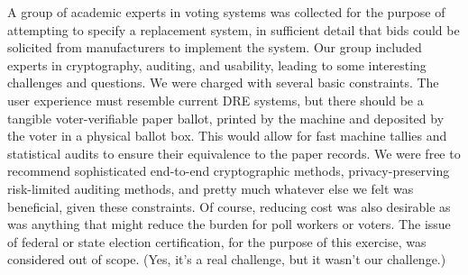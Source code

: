 A group of academic experts in voting systems was collected for the
purpose of attempting to specify a replacement system, in sufficient
detail that bids could be solicited from manufacturers to implement
the system. Our group included experts in cryptography, auditing, and
usability, leading to some interesting challenges and questions. We
were charged with several basic constraints. The user experience must
resemble current DRE systems, but there should be a tangible
voter-verifiable paper ballot, printed by the machine and deposited by
the voter in a physical ballot box. This would allow for fast machine
tallies and statistical audits to ensure their equivalence to the
paper records. We were free to recommend sophisticated end-to-end
cryptographic methods, privacy-preserving risk-limited auditing
methods, and pretty much whatever else we felt was beneficial, given
these constraints. Of course, reducing cost was also desirable as was
anything that might reduce the burden for poll workers or voters. The
issue of federal or state election certification, for the purpose of
this exercise, was considered out of scope. (Yes, it's a real
challenge, but it wasn't our challenge.)

